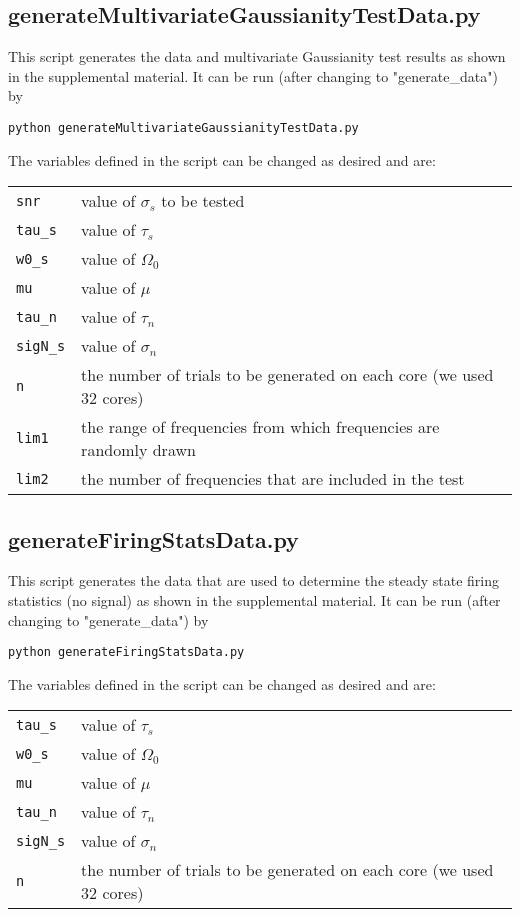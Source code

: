 \documentclass{article}
\begin{document}
\subsection{generateMultivariateGaussianityTestData.py}
This script generates the data and multivariate Gaussianity test results as shown in the supplemental material. It can be run (after changing to "generate\_data") by
\begin{verbatim}
python generateMultivariateGaussianityTestData.py
\end{verbatim}
The variables defined in the script can be changed as desired and are:
\begin{table}[h]
\label{my-label}
\begin{tabular}{ll}
\verb!snr!    & value of $\sigma_s$ to be tested \\
\verb!tau_s! & value of $\tau_s$                 \\
\verb!w0_s!  & value of $\Omega_0$               \\
\verb!mu!  & value of $\mu$\\
\verb!tau_n!  & value of $\tau_n$\\
\verb!sigN_s!  & value of $\sigma_n$\\
  \verb!n!       & the number of trials to be generated on each core (we used 32 cores) \\
\verb!lim1! & the range of frequencies from which frequencies are randomly drawn\\
\verb!lim2! & the number of frequencies that are included in the test

\end{tabular}
\end{table}

\subsection{generateFiringStatsData.py}
This script generates the data that are used to determine the steady state firing statistics (no signal) as shown in the supplemental material. It can be run (after changing to "generate\_data") by
\begin{verbatim}
python generateFiringStatsData.py
\end{verbatim}
The variables defined in the script can be changed as desired and are:
\begin{table}[h!]
\label{my-label}
\begin{tabular}{ll}
\verb!tau_s! & value of $\tau_s$                 \\
\verb!w0_s!  & value of $\Omega_0$               \\
\verb!mu!  & value of $\mu$\\
\verb!tau_n!  & value of $\tau_n$\\
\verb!sigN_s!  & value of $\sigma_n$\\
\verb!n!       & the number of trials to be generated on each core (we used 32 cores)
\end{tabular}
\end{table}
\end{document}
